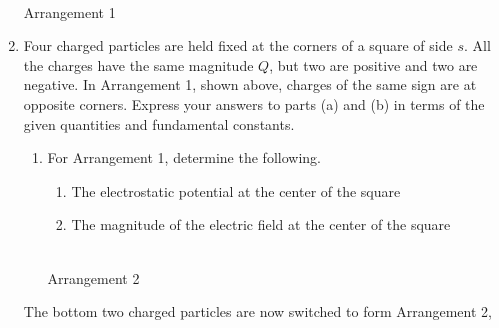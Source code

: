 \documentclass{../../../oss-classkick}
\begin{document}
\begin{enumerate}
  \begin{center}
    \\
    Arrangement 1
  \end{center}
  
\item Four charged particles are held fixed at the corners of a square of
  side $s$. All the charges have the same magnitude $Q$, but two are positive
  and two are negative. In Arrangement 1, shown above, charges of the same
  sign are at opposite corners. Express your answers to parts (a) and (b) in
  terms of the given quantities and fundamental constants.
  \begin{enumerate}[leftmargin=15pt]
  \item For Arrangement 1, determine the following.
    \begin{enumerate}
    \item The electrostatic potential at the center of the square
    \item The magnitude of the electric field at the center of the square
    \end{enumerate}
    \begin{center}
      \\
      Arrangement 2
    \end{center}
  \end{enumerate}  
  The bottom two charged particles are now switched to form Arrangement 2,

\end{enumerate}
\end{document}
